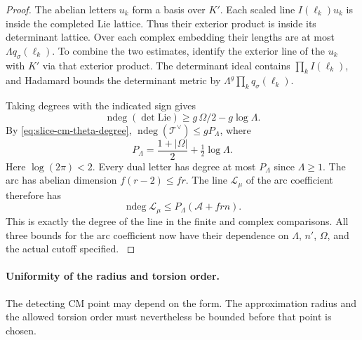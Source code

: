 \begin{proof}
The abelian letters \(u_k\) form a basis over \(K'\). Each
scaled line \(I(\ell_k)u_k\) is inside the completed Lie
lattice. Thus their exterior product is inside its determinant
lattice. Over each complex embedding their lengths are at
most \(\Lambda q_\sigma(\ell_k)\).
To combine the two estimates, identify the exterior line of
the \(u_k\) with \(K'\) via that exterior product. The
determinant ideal contains \(\prod_k I(\ell_k)\), and
Hadamard bounds the determinant metric by
\(\Lambda^g\prod_k q_\sigma(\ell_k)\).

Taking degrees with the indicated sign gives
\[
 \operatorname{ndeg}(\det\mathrm{Lie})
             \ge g\,\Omega/2-g\log\Lambda .
\]
By \eqref{eq:slice-cm-theta-degree},
\(\operatorname{ndeg}(\mathcal T^\vee)\le g P_\Lambda\),
where
\[
             P_\Lambda=\frac{1+|\Omega|}{2}
                                  +\tfrac12\log\Lambda .
\]
Here \(\log(2\pi)<2\). Every dual letter has degree
at most \(P_\Lambda\) since \(\Lambda\ge1\).
The arc has abelian dimension \(f(r-2)\le fr\).
The line \(\mathcal L_\mu\) of the arc coefficient therefore
has
\begin{equation}\label{eq:slice-cm-line-degree}
    \operatorname{ndeg}\mathcal L_\mu
           \le P_\Lambda(\mathcal A+frn).
\end{equation}
This is exactly the degree of the line in the finite and
complex comparisons. All three bounds for the arc
coefficient now have their dependence on \(\Lambda\), \(n'\),
\(\Omega\), and the actual cutoff specified.
\label{cor:slice-integral-norm-3}

\end{proof}

\paragraph{Uniformity of the radius and torsion order.}

The detecting CM point may depend on the form. The approximation radius and the allowed torsion order must nevertheless be bounded before that point is chosen.

